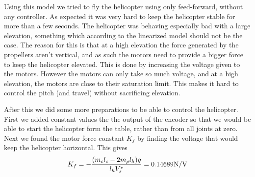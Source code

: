 \iffalse
Linearizing the system gives

\begin{subequations}
	\begin{align}
		\ddot{\tilde p} &= \partialderiv{\ddot{\tilde{p}}}{\tilde p} + \partialderiv{\ddot{\tilde p}}{\tilde e} + \partialderiv{\ddot{\tilde p}}{\tilde \lambda} + \partialderiv{\ddot{\tilde p}}{\tilde V_s} + \partialderiv{\ddot{\tilde p}}{\tilde V_d} = 0 + 0 + 0 + 0 + \frac{L_1}{J_p} \tilde V_d = \frac{L_1}{J_p} \tilde V_d = K_1 \tilde V_d\\
		\ddot{\tilde e} &= \partialderiv{\ddot{\tilde{e}}}{\tilde p} + \partialderiv{\ddot{\tilde{e}}}{\tilde e} + \partialderiv{\ddot{\tilde{e}}}{\tilde \lambda} + \partialderiv{\ddot{\tilde e}}{\tilde V_s} + \partialderiv{\ddot{\tilde e}}{\tilde V_d} = 0 + 0 + 0 + \frac{L_3}{J_e} \tilde V_s + 0 = \frac{L_3}{J_e} \tilde V_s = K_2 \tilde V_s\\
		\ddot{\tilde \lambda} &= \partialderiv{\ddot{\tilde \lambda}}{\tilde p} + \partialderiv{\ddot{\tilde \lambda}}{\tilde p} + \partialderiv{\ddot{\tilde \lambda}}{\tilde \lambda} + \partialderiv{\ddot{\tilde \lambda}}{\tilde V_s} + \partialderiv{\ddot{\tilde \lambda}}{\tilde V_d} = -\frac{L_2}{J_{\lambda}} \tilde p + 0 + 0 + 0 + 0 = -\frac{L_2}{J_{\lambda}} \tilde p = K_3 \tilde p 
	\end{align}
\end{subequations}
\fi

Using this model we tried to fly the helicopter using only feed-forward, without any controller. As expected it was very hard to keep the helicopter stable for more than a few seconds. The helicopter was behaving especially bad with a large elevation, something which according to the linearized model should not be the case. The reason for this is that at a high elevation the force generated by the propellers aren't vertical, and as such the motors need to provide a bigger force to keep the helicopter elevated. This is done by increasing the voltage given to the motors. However the motors can only take so much voltage, and at a high elevation, the motors are  close to their saturation limit. This makes it hard to control the pitch (and travel) without sacrificing elevation.

After this we did some more preparations to be able to control the helicopter. First we added constant values the the output of the encoder so that we would be able to start the helicopter form the table, rather than from all joints at zero. Next we found the motor force constant $K_f$ by finding the voltage that would keep the helicopter horizontal. This gives
\begin{equation}
	K_f = -\frac{(m_cl_c-2m_pl_h)g}{l_hV_s^*} = 0.14689\si[per-mode=symbol]{\newton\per\volt}
\end{equation}